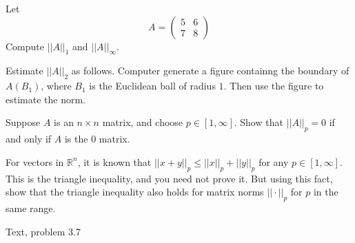 \documentclass[minion]{homework}
\newcommand{\Reals}{\mathbb{R}}
\begin{document}
\begin{problems}
\newpage
\problem 
\begin{subproblems}
\item Let 
\[
A=\begin{pmatrix} 5 & 6\\
7 & 8 \end{pmatrix}
\]
Compute $||A||_1$ and $||A||_\infty$.
\item Estimate $||A||_2$ as follows.  Computer generate a figure
containng the boundary of $A(B_1)$, where $B_1$ is the Euclidean 
ball of radius $1$.  Then use the figure to estimate the norm.
\item Suppose $A$ is an $n\times n$ matrix, and choose $p\in [1,\infty]$.
Show that $||A||_p=0$ if and only if $A$ is the 0 matrix.
\item For vectors in $\Reals^n$, it is known that $||x+y||_p\le ||x||_p+||y||_p$
for any $p\in [1,\infty]$.  This is the triangle inequality, and you need
not prove it.  But using this fact, show that the triangle inequality
also holds for matrix norms $||\cdot||_p$ for $p$ in the same range.
\end{subproblems}

\problem Text, problem 3.7

\end{problems}
\end{document}
